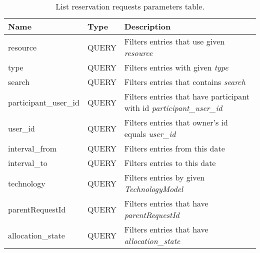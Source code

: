 \begin{table}[H]
    \label{tab:res}
    \begin{tabularx}{\textwidth}{llX}
        \toprule
        Name & Type & Description \\
        \midrule
        resource & QUERY & Filters entries that use given \emph{resource} \\
        type & QUERY & Filters entries with given \emph{type} \\
        search & QUERY & Filters entries that contains \emph{search} \\
        participant\_user\_id & QUERY &  Filters entries that have participant with id \emph{participant\_user\_id} \\
        user\_id & QUERY & Filters entries that owner's id equals \emph{user\_id} \\
        interval\_from & QUERY & Filters entries from this date \\  
        interval\_to & QUERY & Filters entries to this date \\
        technology & QUERY & Filters entries by given \emph{TechnologyModel} \\
        parentRequestId & QUERY & Filters entries that have \emph{parentRequestId} \\
        allocation\_state & QUERY & Filters entries that have \emph{allocation\_state} \\
        \bottomrule
    \end{tabularx}
    \caption{List reservation requests parameters table.}
\end{table}
